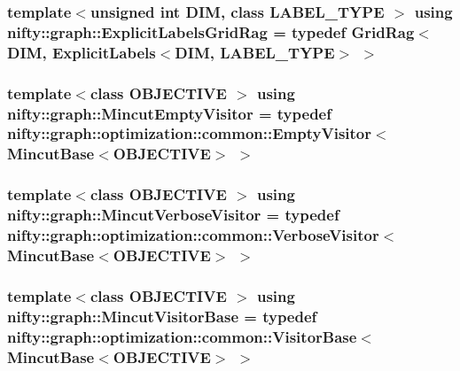 \subsubsection[{Explicit\+Labels\+Grid\+Rag}]{\setlength{\rightskip}{0pt plus 5cm}template$<$unsigned int D\+I\+M, class L\+A\+B\+E\+L\+\_\+\+T\+Y\+P\+E $>$ using {\bf nifty\+::graph\+::\+Explicit\+Labels\+Grid\+Rag} = typedef {\bf Grid\+Rag}$<$D\+I\+M, {\bf Explicit\+Labels}$<$D\+I\+M, L\+A\+B\+E\+L\+\_\+\+T\+Y\+P\+E$>$ $>$}\label{namespacenifty_1_1graph_a45cca2dcd061996d13ec8e6bb8afb200}
\hypertarget{namespacenifty_1_1graph_ac52f1f3f31061d1a6130a80e7a11e0e0}{}
\subsubsection[{Mincut\+Empty\+Visitor}]{\setlength{\rightskip}{0pt plus 5cm}template$<$class O\+B\+J\+E\+C\+T\+I\+V\+E $>$ using {\bf nifty\+::graph\+::\+Mincut\+Empty\+Visitor} = typedef {\bf nifty\+::graph\+::optimization\+::common\+::\+Empty\+Visitor}$<$ {\bf Mincut\+Base}$<$O\+B\+J\+E\+C\+T\+I\+V\+E$>$ $>$}\label{namespacenifty_1_1graph_ac52f1f3f31061d1a6130a80e7a11e0e0}
\hypertarget{namespacenifty_1_1graph_a12b1431afc72b38c31489d40661c163f}{}
\subsubsection[{Mincut\+Verbose\+Visitor}]{\setlength{\rightskip}{0pt plus 5cm}template$<$class O\+B\+J\+E\+C\+T\+I\+V\+E $>$ using {\bf nifty\+::graph\+::\+Mincut\+Verbose\+Visitor} = typedef {\bf nifty\+::graph\+::optimization\+::common\+::\+Verbose\+Visitor}$<$ {\bf Mincut\+Base}$<$O\+B\+J\+E\+C\+T\+I\+V\+E$>$ $>$}\label{namespacenifty_1_1graph_a12b1431afc72b38c31489d40661c163f}
\hypertarget{namespacenifty_1_1graph_abcf758110c216f393d7f20219d3fcf1b}{}
\subsubsection[{Mincut\+Visitor\+Base}]{\setlength{\rightskip}{0pt plus 5cm}template$<$class O\+B\+J\+E\+C\+T\+I\+V\+E $>$ using {\bf nifty\+::graph\+::\+Mincut\+Visitor\+Base} = typedef {\bf nifty\+::graph\+::optimization\+::common\+::\+Visitor\+Base}$<$ {\bf Mincut\+Base}$<$O\+B\+J\+E\+C\+T\+I\+V\+E$>$ $>$}\label{namespacenifty_1_1graph_abcf758110c216f393d7f20219d3fcf1b}
\hypertarget{namespacenifty_1_1graph_ac6c35595563f4188e7cbac37871801b8}{}

